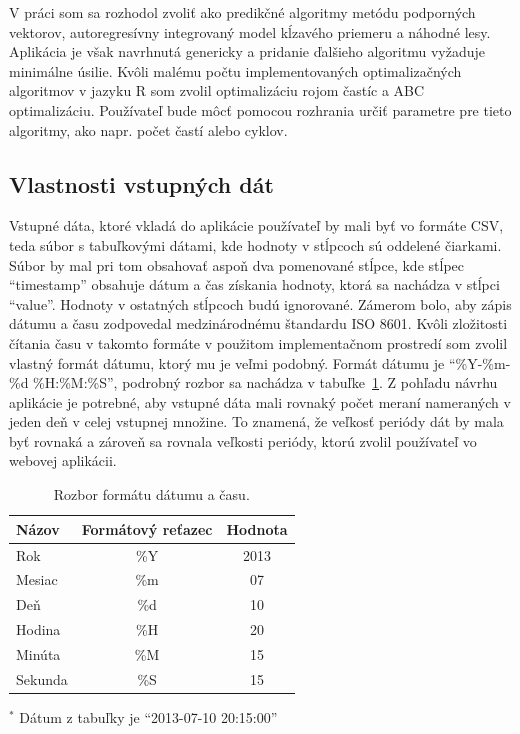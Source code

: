 \documentclass[a4paper,slovak,12pt,appendix]{article}
\begin{document}
V práci som sa rozhodol zvoliť ako predikčné algoritmy metódu podporných
vektorov, autoregresívny integrovaný model kĺzavého priemeru a náhodné lesy.
Aplikácia je však navrhnutá genericky a pridanie ďalšieho algoritmu vyžaduje
minimálne úsilie. Kvôli malému počtu implementovaných optimalizačných
algoritmov v jazyku R som zvolil optimalizáciu rojom častíc a ABC
optimalizáciu. Používateľ bude môcť pomocou rozhrania určiť parametre pre tieto
algoritmy, ako napr. počet častí alebo cyklov.


\subsection{Vlastnosti vstupných dát}
Vstupné dáta, ktoré vkladá do aplikácie používateľ by mali byť vo formáte CSV,
teda súbor s tabuľkovými dátami, kde hodnoty v stĺpcoch sú oddelené čiarkami.
Súbor by mal pri tom obsahovať aspoň dva pomenované stĺpce, kde stĺpec ``timestamp''
obsahuje dátum a čas získania hodnoty, ktorá sa nachádza v stĺpci ``value''.
Hodnoty v ostatných stĺpcoch budú ignorované.
Zámerom bolo, aby zápis dátumu a času zodpovedal medzinárodnému štandardu
ISO 8601. Kvôli zložitosti čítania času v takomto formáte v použitom
implementačnom prostredí som zvolil vlastný formát dátumu, ktorý mu je veľmi
podobný. Formát dátumu je ``\%Y-\%m-\%d \%H:\%M:\%S'', podrobný rozbor sa
nachádza v tabuľke~\ref{tab-timestamp}. Z pohľadu návrhu aplikácie je potrebné,
aby vstupné dáta mali rovnaký počet meraní nameraných v jeden deň v celej
vstupnej množine. To znamená, že veľkosť periódy dát by mala byť rovnaká
a zároveň sa rovnala veľkosti periódy, ktorú zvolil používateľ vo webovej
aplikácii.

\begin{table}[ht]
  \centering
  \caption{Rozbor formátu dátumu a času.}
  \label{tab-timestamp}
  \begin{threeparttable}
    \begin{tabular}{|l|c|c|}
      \hline
      \textbf{Názov}  &   \textbf{Formátový reťazec}  &   \textbf{Hodnota}  \\ \hline
      Rok     & \%Y & 2013 \\ \hline
      Mesiac  & \%m & 07 \\ \hline
      Deň     & \%d & 10 \\ \hline
      Hodina  & \%H & 20 \\ \hline
      Minúta  & \%M & 15 \\ \hline
      Sekunda & \%S & 15 \\ \hline
    \end{tabular}
    \begin{tablenotes} \footnotesize
      \item $^{*}$ Dátum z tabuľky je ``2013-07-10 20:15:00''
    \end{tablenotes}
  \end{threeparttable}
\end{table}
\end{document}
